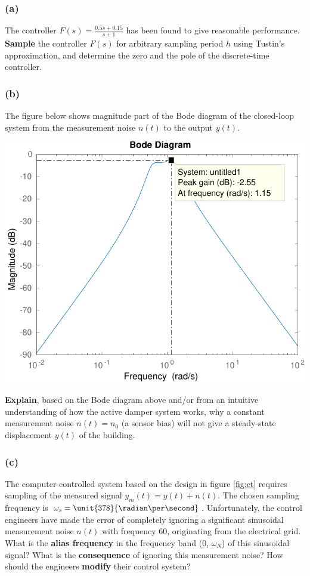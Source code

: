 \documentclass[letterpaper,11pt]{article}
\newcommand{\bmpl}{\begin{minipage}[t]{\textwidth}}
\newcommand{\emp}{\end{minipage}}
\begin{document}
\subsubsection*{(a)}
The controller $F(s) = \frac{0.5s + 0.15}{s+1}$ has been found to give reasonable performance. \textbf{Sample} the controller $F(s)$ for arbitrary sampling period $h$ using Tustin's approximation, and determine the zero and the pole of the discrete-time controller. 

\noindent
\fbox{
\bmpl
{\bf Calculations:}\\
\vspace*{100mm}
\emp}



\subsubsection*{(b)}
The figure below shows magnitude part of the Bode diagram of the closed-loop system from the measurement noise $n(t)$ to the output $y(t)$.  
\begin{center}
\includegraphics[width=0.5\linewidth]{amd_bode_Gc_magn-crop}
\end{center}


\textbf{Explain}, based on the Bode diagram above and/or from an intuitive understanding of how the active damper system works, why a constant measurement noise \(n(t)=n_0\) (a sensor bias) will not give a steady-state displacement $y(t)$ of the building.

\noindent
\fbox{
\bmpl
{\bf Explanation:}\\
\vspace*{60mm}
\emp}

\subsubsection*{(c)}
The computer-controlled system based on the design in figure \ref{fig:ct} requires sampling of the measured signal \(y_m(t) = y(t) + n(t)\). The chosen sampling frequency is \(\omega_s = \unit{378}{\radian\per\second}\). Unfortunately, the control engineers have made the error of completely ignoring a significant sinusoidal measurement noise $n(t)$ with frequency \unit{60}{\hertz}, originating from the electrical grid. What is the \textbf{alias frequency} in the frequency band (0, \(\omega_N\)) of this sinusoidal signal? What is the \textbf{consequence} of ignoring this measurement noise? How should the engineers \textbf{modify} their control system?     
\end{document}
